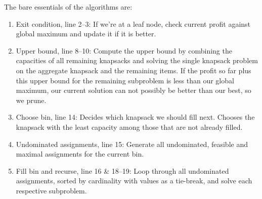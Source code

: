 \documentclass[b5paper]{article}
\begin{document}
The bare essentials of the algorithms are:

\begin{enumerate}
    \item Exit condition, line 2--3: If we're at a leaf node, check current profit against global maximum and update it if it is better.
    \item Upper bound, line 8--10: Compute the upper bound by combining the capacities of all remaining knapsacks and solving the single knapsack problem on the aggregate knapsack and the remaining items.
    If the profit so far plus this upper bound for the remaining subproblem is less than our global maximum, our current solution can not possibly be better than our best, so we prune.
    \item Choose bin, line 14: Decides which knapsack we should fill next. Chooses the knapsack with the least capacity among those that are not already filled.
    \item Undominated assignments, line 15: Generate all undominated, feasible and maximal assignments for the current bin.
    \item Fill bin and recurse, line 16 \& 18--19: Loop through all undominated assignments, sorted by cardinality with values as a tie-break, and solve each respective subproblem.
\end{enumerate}
\end{document}
